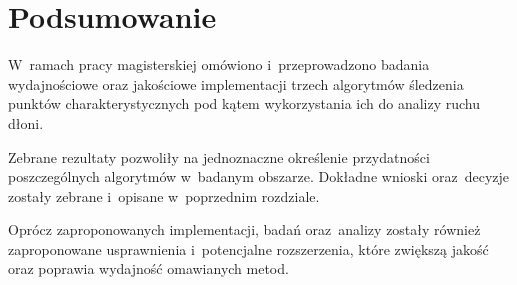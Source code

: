   \section{Podsumowanie}

    W~ramach pracy magisterskiej omówiono i~przeprowadzono badania wydajnościowe oraz jakościowe implementacji trzech algorytmów śledzenia punktów charakterystycznych pod kątem wykorzystania ich do analizy ruchu dłoni.

    Zebrane rezultaty pozwoliły na jednoznaczne określenie przydatności poszczególnych algorytmów w~badanym obszarze. Dokładne wnioski oraz~decyzje zostały zebrane i~opisane w~poprzednim rozdziale.

    Oprócz zaproponowanych implementacji, badań oraz~analizy zostały również zaproponowane usprawnienia i~potencjalne rozszerzenia, które zwiększą jakość oraz poprawia wydajność omawianych metod.